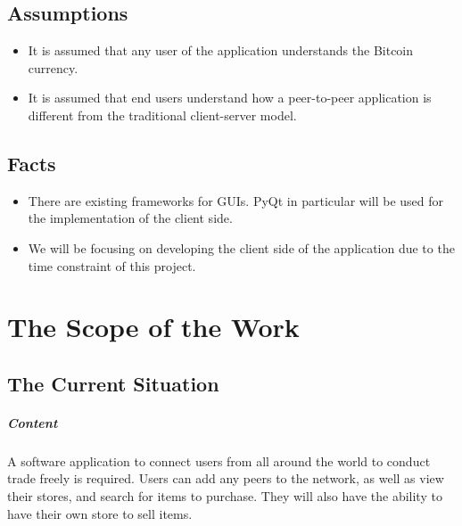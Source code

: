 \documentclass{article}
\begin{document}
\subsection{Assumptions}
\begin{itemize}
	
\item
It is assumed that any user of the application understands the Bitcoin currency.

\item
It is assumed that end users understand how a peer-to-peer application is different from the traditional client-server model.
\end{itemize}

\subsection{Facts}
\begin{itemize}
	
\item
There are existing frameworks for GUIs. PyQt in particular will be used for the implementation of the client side. 
\item
We will be focusing on developing the client side of the application due to the time constraint of this project.
	
\end{itemize} 

\section{The Scope of the Work}
\subsection{The Current Situation}
\subparagraph{Content}
A software application to connect users from all around the world to conduct trade freely is required. Users can add any peers to the network, as well as view their stores, and search for items to purchase. They will also have the ability to have their own store to sell items.
\end{document}

